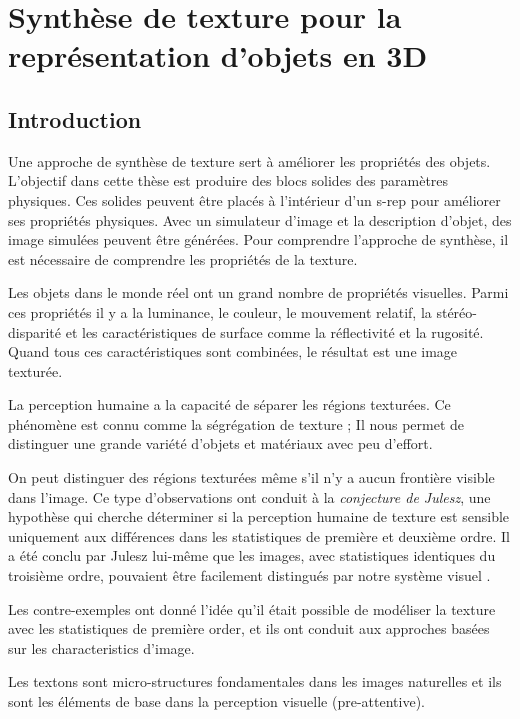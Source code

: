 \section{Synthèse de texture pour la représentation d'objets en 3D}
\label{chapter:textureSynthesisfr}

\subsection{Introduction}

Une approche de synthèse de texture sert à améliorer les propriétés des objets.
L'objectif dans cette thèse est produire des blocs solides des paramètres physiques.
Ces solides peuvent être placés à l'intérieur d'un s-rep pour améliorer ses propriétés physiques.
Avec un simulateur d'image et la description d'objet, des image simulées peuvent être générées.
Pour comprendre l'approche de synthèse, il est nécessaire de comprendre les propriétés de la texture.

Les objets dans le monde réel ont un grand nombre de propriétés visuelles.
Parmi ces propriétés il y a la luminance, le couleur, le mouvement relatif, la stéréo-disparité
et les caractéristiques de surface comme la réflectivité et la rugosité.
Quand tous ces caractéristiques sont combinées, le résultat est une image texturée.

La perception humaine a la capacité de séparer les régions texturées.
Ce phénomène est connu comme la ségrégation de texture ;
Il nous permet de distinguer une grande variété d'objets et matériaux avec peu d'effort.

On peut distinguer des régions texturées même s'il n'y a aucun frontière visible dans l'image.
Ce type d'observations ont conduit à la \textit{conjecture de Julesz}, une hypothèse
qui cherche déterminer si la perception humaine de texture est sensible uniquement aux différences
dans les statistiques de première %
et deuxième ordre. %
Il a été conclu par Julesz lui-même que les images, avec statistiques 
identiques du troisième ordre,
pouvaient 
être facilement distingués par notre système visuel \cite{julesz1978visual}.

Les contre-exemples ont donné l'idée qu'il était possible de modéliser 
la texture avec les statistiques de première order, et 
ils ont conduit aux approches basées sur les characteristics d'image.

\begin{definition}
Les textons sont micro-structures fondamentales dans les images naturelles et ils sont les éléments de base dans la perception visuelle (pre-attentive).
\end{definition}

